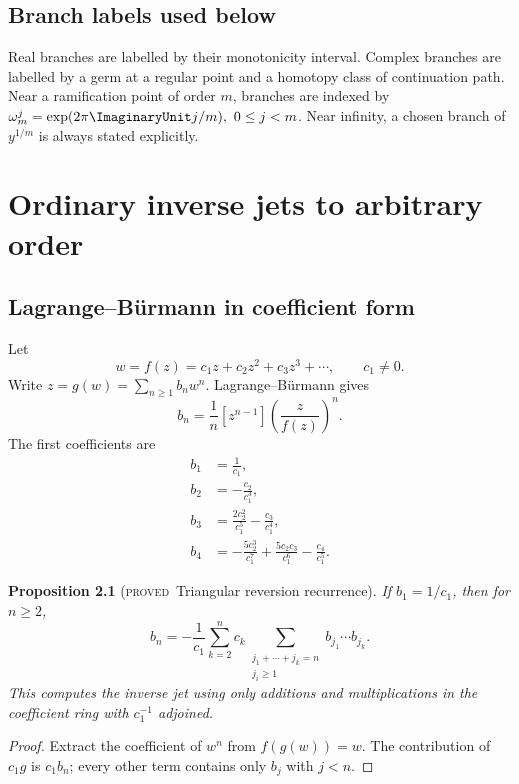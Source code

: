 \documentclass[11pt,letterpaper,oneside,openany]{book}
\newtheorem{proposition}{Proposition}[chapter]
\theoremstyle{definition}
\theoremstyle{remark}
\newcommand{\statusproved}{\textcolor{provedgreen}{\textsc{proved}}}
\begin{document}
\section{Branch labels used below}
Real branches are labelled by their monotonicity interval.  Complex branches
are labelled by a germ at a regular point and a homotopy class of continuation
path.  Near a ramification point of order \(m\), branches are indexed by
\(
 \omega_m^j=\exp(2\pi\ImaginaryUnit j/m),\ 0\le j<m
\).
Near infinity, a chosen branch of \(y^{1/m}\) is always stated explicitly.

\chapter{Ordinary inverse jets to arbitrary order}

\section{Lagrange--Bürmann in coefficient form}
Let
\[
 w=f(z)=c_1z+c_2z^2+c_3z^3+\cdots,
 \qquad c_1\ne0.
\]
Write \(z=g(w)=\sum_{n\ge1}b_nw^n\).  Lagrange--Bürmann gives
\begin{equation}
 b_n=\frac1n[z^{n-1}]
 \left(\frac{z}{f(z)}\right)^n.
 \label{eq:LB}
\end{equation}
The first coefficients are
\begin{align}
 b_1&=\frac1{c_1}, \\
 b_2&=-\frac{c_2}{c_1^3}, \\
 b_3&=\frac{2c_2^2}{c_1^5}-\frac{c_3}{c_1^4}, \label{eq:inverse-first3}\\
 b_4&=-\frac{5c_2^3}{c_1^7}
       +\frac{5c_2c_3}{c_1^6}-\frac{c_4}{c_1^5}.
\end{align}

\begin{proposition}[\statusproved\ Triangular reversion recurrence]
If \(b_1=1/c_1\), then for \(n\ge2\),
\[
 b_n=-\frac1{c_1}
 \sum_{k=2}^{n}c_k
 \sum_{\substack{j_1+\cdots+j_k=n\\j_i\ge1}}
 b_{j_1}\cdots b_{j_k}.
\]
This computes the inverse jet using only additions and multiplications in the
coefficient ring with \(c_1^{-1}\) adjoined.
\end{proposition}
\begin{proof}
Extract the coefficient of \(w^n\) from
\(f(g(w))=w\).  The contribution of \(c_1g\) is \(c_1b_n\); every other term
contains only \(b_j\) with \(j<n\).
\end{proof}
\end{document}
